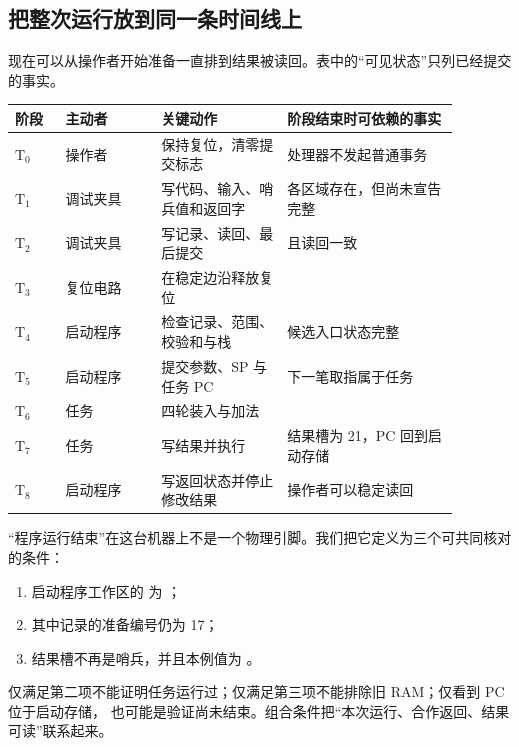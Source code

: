 \subsection{把整次运行放到同一条时间线上}

现在可以从操作者开始准备一直排到结果被读回。表中的“可见状态”只列已经提交的事实。

\begin{longtable}{|L{0.10\linewidth}|L{0.19\linewidth}|L{0.25\linewidth}|L{0.34\linewidth}|}
\hline
{}
阶段 & 主动者 & 关键动作 & 阶段结束时可依赖的事实 \\ \hline
\(\mathrm{T_0}\) & 操作者 & 保持复位，清零提交标志 & 处理器不发起普通事务 \\ \hline
\(\mathrm{T_1}\) & 调试夹具 & 写代码、输入、哨兵值和返回字 & 各区域存在，但尚未宣告完整 \\ \hline
\(\mathrm{T_2}\) & 调试夹具 & 写记录、读回、最后提交 &  且读回一致 \\ \hline
\(\mathrm{T_3}\) & 复位电路 & 在稳定边沿释放复位 &  \\ \hline
\(\mathrm{T_4}\) & 启动程序 & 检查记录、范围、校验和与栈 & 候选入口状态完整 \\ \hline
\(\mathrm{T_5}\) & 启动程序 & 提交参数、SP 与任务 PC & 下一笔取指属于任务 \\ \hline
\(\mathrm{T_6}\) & 任务 & 四轮装入与加法 &  \\ \hline
\(\mathrm{T_7}\) & 任务 & 写结果并执行  & 结果槽为 21，PC 回到启动存储 \\ \hline
\(\mathrm{T_8}\) & 启动程序 & 写返回状态并停止修改结果 & 操作者可以稳定读回 \\ \hline
\end{longtable}

“程序运行结束”在这台机器上不是一个物理引脚。我们把它定义为三个可共同核对的条件：

\begin{enumerate}
\item 启动程序工作区的  为 ；
\item 其中记录的准备编号仍为 17；
\item 结果槽不再是哨兵，并且本例值为 。
\end{enumerate}

仅满足第二项不能证明任务运行过；仅满足第三项不能排除旧 RAM；仅看到 PC 位于启动存储，
也可能是验证尚未结束。组合条件把“本次运行、合作返回、结果可读”联系起来。

